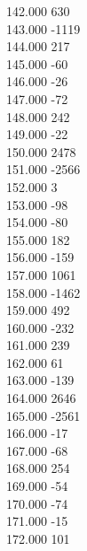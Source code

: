 { 142.000	630 \\
 143.000	-1119 \\
 144.000	217 \\
 145.000	-60 \\
 146.000	-26 \\
 147.000	-72 \\
 148.000	242 \\
 149.000	-22 \\
 150.000	2478 \\
 151.000	-2566 \\
 152.000	3 \\
 153.000	-98 \\
 154.000	-80 \\
 155.000	182 \\
 156.000	-159 \\
 157.000	1061 \\
 158.000	-1462 \\
 159.000	492 \\
 160.000	-232 \\
 161.000	239 \\
 162.000	61 \\
 163.000	-139 \\
 164.000	2646 \\
 165.000	-2561 \\
 166.000	-17 \\
 167.000	-68 \\
 168.000	254 \\
 169.000	-54 \\
 170.000	-74 \\
 171.000	-15 \\
 172.000	101 \\
}
